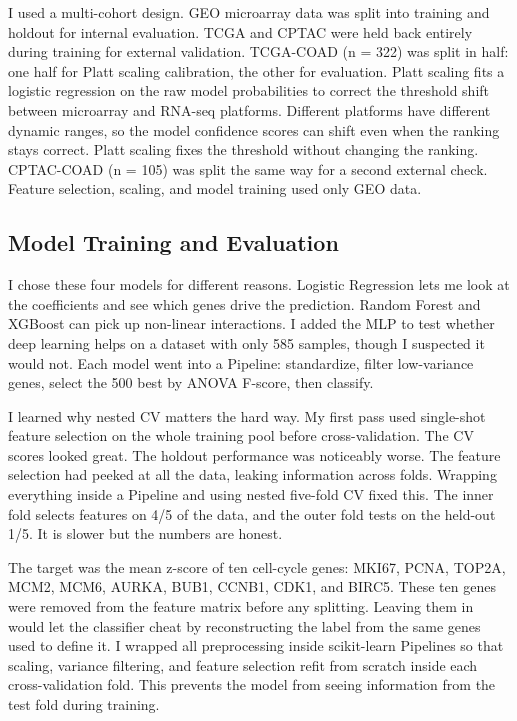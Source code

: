 \documentclass[12pt]{article}
\begin{document}
I used a multi-cohort design. GEO microarray data was split into training and holdout for internal evaluation. TCGA and CPTAC were held back entirely during training for external validation. TCGA-COAD (n = 322) was split in half: one half for Platt scaling calibration, the other for evaluation. Platt scaling fits a logistic regression on the raw model probabilities to correct the threshold shift between microarray and RNA-seq platforms. Different platforms have different dynamic ranges, so the model confidence scores can shift even when the ranking stays correct. Platt scaling fixes the threshold without changing the ranking. CPTAC-COAD (n = 105) was split the same way for a second external check. Feature selection, scaling, and model training used only GEO data.

\subsection{Model Training and Evaluation}

I chose these four models for different reasons. Logistic Regression lets me look at the coefficients and see which genes drive the prediction. Random Forest and XGBoost can pick up non-linear interactions. I added the MLP to test whether deep learning helps on a dataset with only 585 samples, though I suspected it would not. Each model went into a Pipeline: standardize, filter low-variance genes, select the 500 best by ANOVA F-score, then classify.

I learned why nested CV matters the hard way. My first pass used single-shot feature selection on the whole training pool before cross-validation. The CV scores looked great. The holdout performance was noticeably worse. The feature selection had peeked at all the data, leaking information across folds. Wrapping everything inside a Pipeline and using nested five-fold CV fixed this. The inner fold selects features on 4/5 of the data, and the outer fold tests on the held-out 1/5. It is slower but the numbers are honest.

The target was the mean z-score of ten cell-cycle genes: MKI67, PCNA, TOP2A, MCM2, MCM6, AURKA, BUB1, CCNB1, CDK1, and BIRC5. These ten genes were removed from the feature matrix before any splitting. Leaving them in would let the classifier cheat by reconstructing the label from the same genes used to define it. I wrapped all preprocessing inside scikit-learn Pipelines so that scaling, variance filtering, and feature selection refit from scratch inside each cross-validation fold. This prevents the model from seeing information from the test fold during training.
\end{document}
